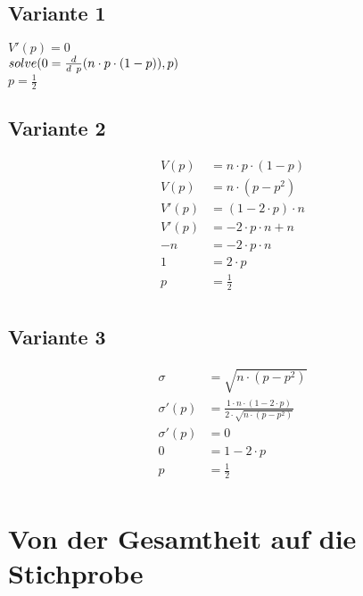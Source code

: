 \documentclass[a4paper,12pt]{article}
\begin{document}
\subsection*{Variante 1}
$V'(p) = 0$\\
$solve\large{(}0 = \frac{d}{d\ p} (n \cdot p \cdot (1 - p)),p\large{)}$\\
$p = \frac{1}{2}$\\
\subsection*{Variante 2}
\begin{equation}
\begin{split}
V(p) & = n \cdot p \cdot (1 - p)\\
V(p) & = n \cdot (p - p^{2})\\
V'(p) & = (1-2 \cdot p) \cdot n\\
V'(p) & = -2 \cdot p \cdot n + n\\
-n & = -2\cdot p \cdot n\\
1 & = 2 \cdot p\\
p & = \frac{1}{2}\\
\end{split}
\end{equation}
\subsection*{Variante 3}
\begin{equation}
\begin{split}
\sigma & = \sqrt{n \cdot (p - p^{2})}\\
\sigma'(p) & = \frac{1 \cdot n \cdot (1 - 2 \cdot p)}{2 \cdot \sqrt{n \cdot (p - p^{2})}}\\
\sigma'(p) & = 0\\
0 & = 1 - 2 \cdot p\\
p & = \frac{1}{2}\\
\end{split}
\end{equation}
\pagebreak
\section{Von der Gesamtheit auf die Stichprobe}
\end{document}
